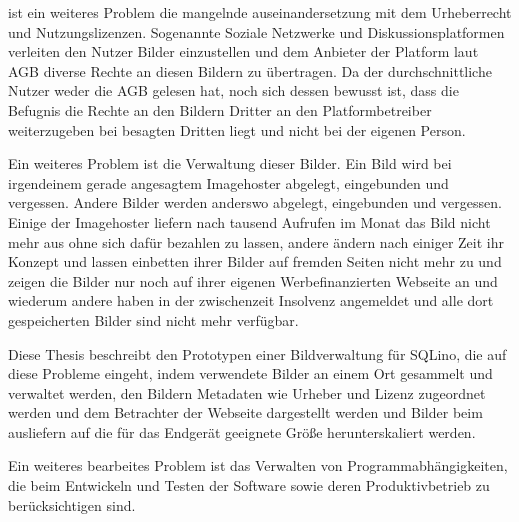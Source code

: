 ist ein weiteres Problem die mangelnde auseinandersetzung
mit dem Urheberrecht und Nutzungslizenzen\todo{}. Sogenannte Soziale Netzwerke und
Diskussionsplatformen verleiten den Nutzer Bilder einzustellen und dem Anbieter der
Platform laut AGB diverse Rechte an diesen Bildern zu übertragen. Da der
durchschnittliche Nutzer weder die AGB gelesen hat, noch sich dessen bewusst
ist, dass die Befugnis die Rechte an den Bildern Dritter an den
Platformbetreiber weiterzugeben bei besagten Dritten liegt und nicht bei der
eigenen Person.


Ein weiteres Problem ist die Verwaltung dieser Bilder. Ein Bild wird bei
irgendeinem gerade angesagtem Imagehoster abgelegt, eingebunden und vergessen.
Andere Bilder werden anderswo abgelegt, eingebunden und vergessen. Einige der
Imagehoster liefern nach tausend Aufrufen im Monat das Bild nicht mehr aus ohne
sich dafür bezahlen zu lassen, andere ändern nach einiger Zeit ihr Konzept und
lassen einbetten ihrer Bilder auf fremden Seiten nicht mehr zu und zeigen die
Bilder nur noch auf ihrer eigenen Werbefinanzierten Webseite an und wiederum
andere haben in der zwischenzeit Insolvenz angemeldet und alle dort
gespeicherten Bilder sind nicht mehr verfügbar.

Diese Thesis beschreibt den Prototypen einer Bildverwaltung für SQLino, die auf
diese Probleme eingeht, indem verwendete Bilder an einem Ort gesammelt und
verwaltet werden, den Bildern Metadaten wie Urheber und Lizenz zugeordnet
werden und dem Betrachter der Webseite dargestellt werden und Bilder beim
ausliefern auf die für das Endgerät geeignete Größe herunterskaliert werden.

Ein weiteres bearbeites Problem ist das Verwalten von Programmabhängigkeiten,
die beim Entwickeln und Testen der Software sowie deren Produktivbetrieb zu
berücksichtigen sind. 

